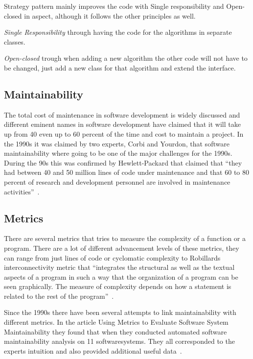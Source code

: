 \documentclass[conference, a4paper]{IEEEtran}
\begin{document}
Strategy pattern mainly improves the code with Single responsibility and Open-closed in aspect, although it follows the other principles as well.

\textit{Single Responsibility} through having the code for the algorithms in separate classes.

\textit{Open-closed} trough when adding a new algorithm the other code will not have to be changed, just add a new class for that algorithm and extend the interface.

\subsection{Maintainability}
\label{sec:Maintainability}
The total cost of maintenance in software development is widely discussed and different eminent names in software development have claimed that it will take up from 40 even up to 60 percent of the time and cost to maintain a project. In the 1990s it was claimed by two experts, Corbi and Yourdon, that software maintainability where going to be one of the major challenges for the 1990s. During the 90s this was confirmed by Hewlett-Packard that claimed that ``they had between 40 and 50 million lines of code under maintenance and that 60 to 80 percent of research and development personnel are involved in maintenance activities''~\cite{bibitem:MetricsToEvaluate}.

\subsection{Metrics}
There are several metrics that tries to measure the complexity of a function or a program. There are a lot of different advancement levels of these metrics, they can range from just lines of code or cyclomatic complexity to Robillards interconnectivity metric that ``integrates the structural as well as the textual aspects of a program in such a way that the organization of a program can be seen graphically. The measure of complexity depends on how a statement is related to the rest of the program''~\cite{bibitem:Robillard}.

Since the 1990s there have been several attempts to link maintainability with different metrics. In the article Using Metrics to Evaluate Software System Maintainability they found that when they conducted automated software maintainability analysis on 11 softwaresystems. They all corresponded to the experts intuition and also provided additional useful data~\cite{bibitem:MetricsToEvaluate}.
\end{document}
